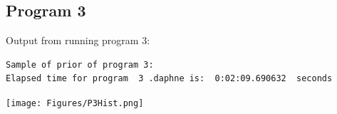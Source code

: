 \documentclass[]{article}
\begin{document}
\subsection{Program 3}
Output from running program 3:
\begin{verbatim}
Sample of prior of program 3:
Elapsed time for program  3 .daphne is:  0:02:09.690632  seconds

\end{verbatim}
\begin{center}
	\texttt{[image: Figures/P3Hist.png]}
\end{center}
 
\end{document}
